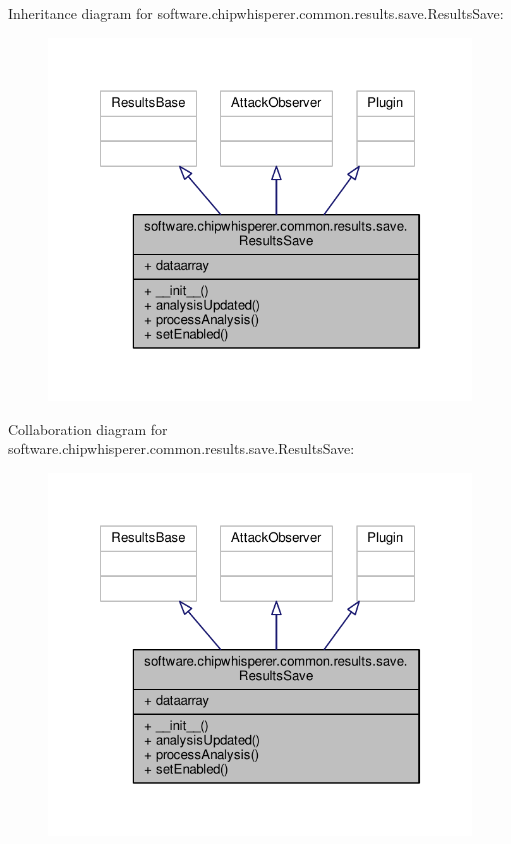 Inheritance diagram for software.\+chipwhisperer.\+common.\+results.\+save.\+Results\+Save\+:\nopagebreak
\begin{figure}[H]
\begin{center}
\leavevmode
\includegraphics[width=322pt]{d8/d38/classsoftware_1_1chipwhisperer_1_1common_1_1results_1_1save_1_1ResultsSave__inherit__graph}
\end{center}
\end{figure}


Collaboration diagram for software.\+chipwhisperer.\+common.\+results.\+save.\+Results\+Save\+:\nopagebreak
\begin{figure}[H]
\begin{center}
\leavevmode
\includegraphics[width=322pt]{db/d47/classsoftware_1_1chipwhisperer_1_1common_1_1results_1_1save_1_1ResultsSave__coll__graph}
\end{center}
\end{figure}


